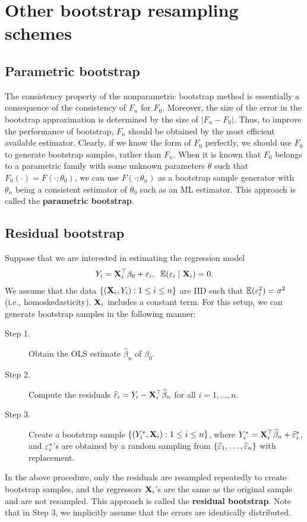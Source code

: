 \documentclass[11pt, A4paper, openany, uplatex]{book}
\begin{document}
\section{Other bootstrap resampling schemes}
\subsection{Parametric bootstrap}

The consistency property of the nonparametric bootstrap method is essentially a consequence of the consistency of $F_n$ for $F_0$.
Moreover, the size of the error in the bootstrap approximation is determined by the size of $|F_n - F_0|$.
Thus, to improve the performance of bootstrap, $F_n$ should be obtained by the most efficient available estimator.
Clearly, if we know the form of $F_0$ perfectly, we should use $F_0$ to generate bootstrap samples, rather than $F_n$.
When it is known that $F_0$ belongs to a parametric family with some unknown parameters $\theta$ such that $F_0(\cdot) = F(\cdot ; \theta_0)$, we can use $F(\cdot ; \theta_n)$ as a bootstrap sample generator with $\theta_n$ being a consistent estimator of $\theta_0$ such as an ML estimator.
This approach is called the \textbf{parametric bootstrap}.

\subsection{Residual bootstrap}

Suppose that we are interested in estimating the regression model
\begin{align*}
	Y_i = \mathbf{X}_i^\top \beta_0 + \varepsilon_i, \;\; \mathbb{E}(\varepsilon_i \mid \mathbf{X}_i) = 0.
\end{align*}
We assume that the data $\{(\mathbf{X}_i, Y_i) : 1 \le i \le n\}$ are IID such that $\mathbb{E}(\varepsilon_i^2) = \sigma^2$ (i.e., homoskedasticity).
$\mathbf{X}_i$ includes a constant term.
For this setup, we can generate bootstrap samples in the following manner:
\begin{description}
	\item[Step 1.] Obtain the OLS estimate $\hat \beta_n$ of $\beta_0$.
	\item[Step 2.] Compute the residuals $\widehat {\varepsilon}_i = Y_i - \mathbf{X}_i^\top \widehat \beta_n$ for all $i=1, \ldots, n$.
	\item[Step 3.] Create a bootstrap sample $\{(Y_i^*, \mathbf{X}_i): 1 \le i \le n\}$, where $Y_i^* = \mathbf{X}_i^\top \widehat \beta_n + \widehat {\varepsilon}_i^*$, and $\varepsilon^*_i$'s are obtained by a random sampling from $\{\widehat {\varepsilon}_1, \ldots, \widehat {\varepsilon}_n\}$ with replacement.
\end{description}
In the above procedure, only the residuals are resampled repeatedly to create bootstrap samples, and the regressors $\mathbf{X}_i$'s are the same as the original sample and are not resampled.
This approach is called the \textbf{residual bootstrap}.
Note that in Step 3, we implicitly assume that the errors are identically distributed.
\end{document}

